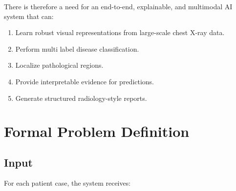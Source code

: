 There is therefore a need for an end-to-end, explainable, and multimodal AI system that can:

\begin{enumerate}
    \item Learn robust visual representations from large-scale chest X-ray data.
    \item Perform multi label disease classification.
    \item Localize pathological regions.
    \item Provide interpretable evidence for predictions.
    \item Generate structured radiology-style reports.
\end{enumerate}

\section{Formal Problem Definition}

\subsection{Input}

For each patient case, the system receives:

